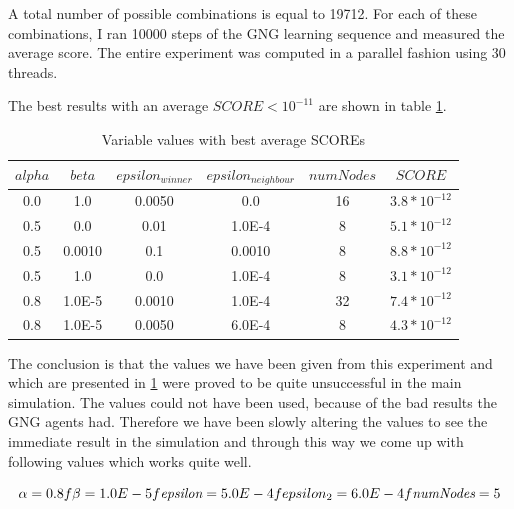 A total number of possible combinations is equal to 19712. For each of these combinations, I ran 10000 steps of the GNG learning sequence and measured the average score. The entire experiment was computed in a parallel fashion using 30 threads.

The best results with an average $SCORE < 10^{-11}$ are shown in table \ref{usedalgo:gngexperimentresults}.

\begin{table}
\begin{center}
\begin{tabular}{ccccc|c}

$alpha$ & $beta$ & $epsilon_{winner}$ & $epsilon_{neighbour}$ & $numNodes$ & $SCORE$ \\
\hline
0.0 & 1.0 & 0.0050 & 0.0 & 16 & $3.8*10^{-12}$ \\
0.5 & 0.0 & 0.01 & 1.0E-4 & 8 & $5.1*10^{-12}$ \\   
0.5 & 0.0010 & 0.1 & 0.0010 & 8 & $8.8*10^{-12}$ \\ 
0.5 & 1.0 & 0.0 & 1.0E-4 & 8 & $3.1*10^{-12}$ \\     
0.8 & 1.0E-5 & 0.0010 & 1.0E-4 & 32 & $7.4*10^{-12}$ \\
0.8 & 1.0E-5 & 0.0050 & 6.0E-4 & 8 & $4.3*10^{-12}$ \\

\end{tabular}      
\label{usedalgo:gngexperimentresults}
\caption{Variable values with best average SCOREs}
\end{center}
\end{table}

The conclusion is that the values we have been given from this experiment and which are presented in \ref{usedalgo:gngexperimentresults} were proved to be quite unsuccessful in the main simulation. The values could not have been used, because of the bad results the GNG agents had. Therefore we have been slowly altering the values to see the immediate result in the simulation and through this way we come up with following values which works quite well.

\begin{equation} \alpha = 0.8f \\ 
\beta = 1.0E-5f \\ 
\emph{epsilon} = 5.0E-4f \\
\emph{$epsilon_2$} = 6.0E-4f \\
\emph{numNodes} = 5
\end{equation}

